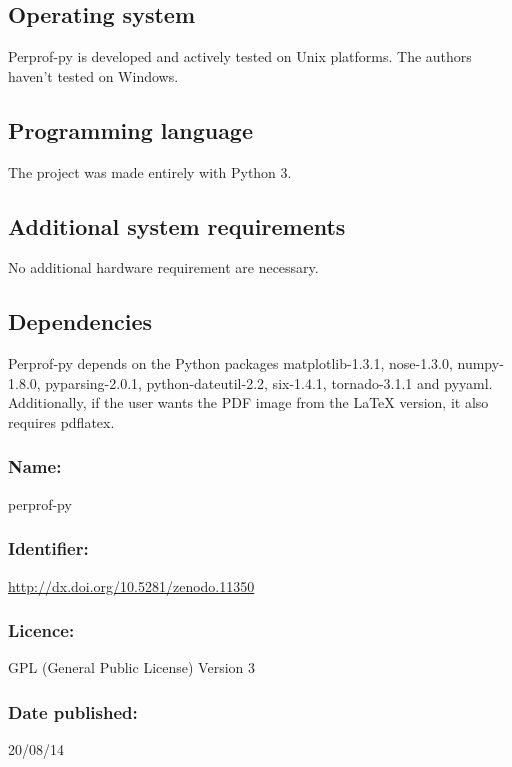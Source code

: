 \subsection*{Operating system}

    Perprof-py is developed and actively tested on Unix platforms.
    The authors haven't tested on Windows.

\subsection*{Programming language}

    The project was made entirely with Python 3.

\subsection*{Additional system requirements}

    No additional hardware requirement are necessary.

\subsection*{Dependencies}

    Perprof-py depends on the Python packages matplotlib-1.3.1, nose-1.3.0,
    numpy-1.8.0, pyparsing-2.0.1, python-dateutil-2.2, six-1.4.1, tornado-3.1.1
    and pyyaml. Additionally, if the user wants the PDF image from the LaTeX
    version, it also requires pdflatex.

\Archive

    \subsubsection*{Name:} perprof-py

    \subsubsection*{Identifier:} \url{http://dx.doi.org/10.5281/zenodo.11350}

    \subsubsection*{Licence:} GPL (General Public License) Version 3

    \subsubsection*{Date published:} 20/08/14

